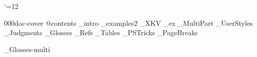 


 \catcode`\@=12










\get 000doc-cover
\get @contents
_intro
_examples2
_XKV
_ex
_MultiPart
_UserStyles
_Judgments
_Glosses
_Refs
_Tables
_PSTricks
_PageBreaks



\bye
{}_Glosses-multi

